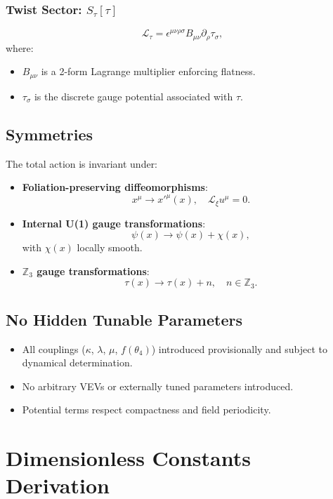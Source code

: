 \documentclass[12pt]{article}
\begin{document}
\subsubsection{Twist Sector: \( S_{\tau}[\tau] \)}
\[
\mathcal{L}_{\tau} = \epsilon^{\mu\nu\rho\sigma} B_{\mu\nu} \partial_\rho \tau_\sigma,
\]
where:
\begin{itemize}
    \item \( B_{\mu\nu} \) is a 2-form Lagrange multiplier enforcing flatness.
    \item \( \tau_\sigma \) is the discrete gauge potential associated with \( \tau \).
\end{itemize}

\subsection{Symmetries}

The total action is invariant under:
\begin{itemize}
    \item \textbf{Foliation-preserving diffeomorphisms}:
    \[
    x^\mu \to x'^\mu(x), \quad \mathcal{L}_\xi u^\mu = 0.
    \]
    \item \textbf{Internal U(1) gauge transformations}:
    \[
    \psi(x) \to \psi(x) + \chi(x),
    \]
    with \( \chi(x) \) locally smooth.
    \item \textbf{\( \mathbb{Z}_3 \) gauge transformations}:
    \[
    \tau(x) \to \tau(x) + n, \quad n \in \mathbb{Z}_3.
    \]
\end{itemize}

\subsection{No Hidden Tunable Parameters}
\begin{itemize}
    \item All couplings (\( \kappa \), \( \lambda \), \( \mu \), \( f(\theta_4) \)) introduced provisionally and subject to dynamical determination.
    \item No arbitrary VEVs or externally tuned parameters introduced.
    \item Potential terms respect compactness and field periodicity.
\end{itemize}

\newpage
\section{Dimensionless Constants Derivation}
\end{document}
